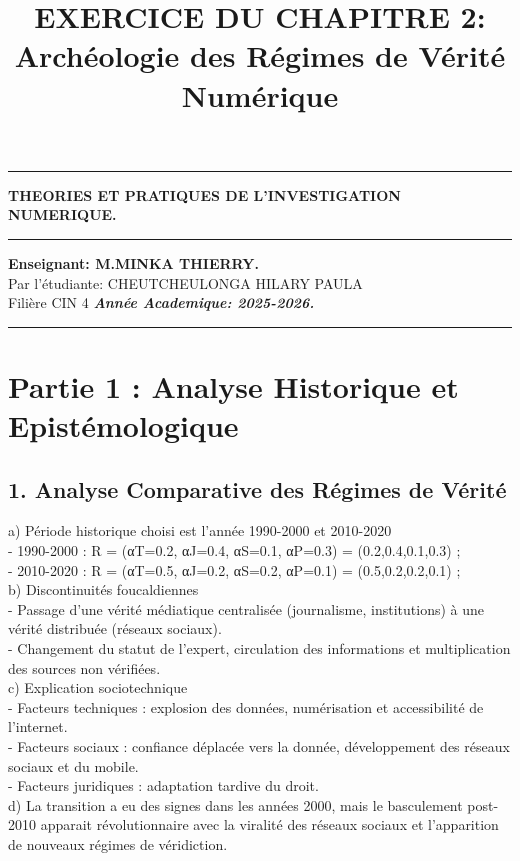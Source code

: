 \documentclass[french]{article}
\title{\textbf{EXERCICE DU CHAPITRE 2: Archéologie des Régimes de Vérité
		Numérique}}
\date{}
\begin{document}
\thispagestyle{empty}
\begin{center}
	\rule{1\textwidth}{2pt}\vspace{\baselineskip}
	\vspace{\baselineskip}\huge\textbf{THEORIES ET PRATIQUES DE L’INVESTIGATION  NUMERIQUE.}
	\rule{1\textwidth}{2pt}\vspace{\baselineskip}
	\vspace{\baselineskip}
	\vfill
	\textbf{Enseignant: M.MINKA THIERRY.}\\
	\vfill
	Par l'étudiante: CHEUTCHEULONGA HILARY PAULA\\
	Filière CIN 4\vfill
	\vspace{\baselineskip}
	\emph{\textbf{Année Academique: 2025-2026.}}
	\rule{1\textwidth}{2pt}\vspace{\baselineskip}
\end{center}
\maketitle

\section{Partie 1 : Analyse Historique et Epistémologique}
\subsection*{1.	Analyse Comparative des Régimes de Vérité}
a)	Période historique choisi est l’année 1990-2000 et 2010-2020\\
-	1990-2000 : R⃗ = (αT=0.2, αJ=0.4, αS=0.1, αP=0.3) = (0.2,0.4,0.1,0.3) ;\\
-	2010-2020 : R⃗ = (αT=0.5, αJ=0.2, αS=0.2, αP=0.1) = (0.5,0.2,0.2,0.1) ;\\
b)	Discontinuités foucaldiennes\\
-	Passage d’une vérité médiatique centralisée (journalisme, institutions) à une vérité distribuée (réseaux sociaux).\\
-	Changement du statut de l’expert, circulation des informations et multiplication des sources non vérifiées.\\
c)	Explication sociotechnique\\
-	Facteurs techniques : explosion des données, numérisation et accessibilité de l’internet.\\
-	Facteurs sociaux : confiance déplacée vers la donnée, développement des réseaux sociaux et du mobile.\\
-	Facteurs juridiques : adaptation tardive du droit.\\
d)	La transition a eu des signes dans les années 2000, mais le basculement post-2010 apparait révolutionnaire avec la viralité des réseaux sociaux et l’apparition de nouveaux régimes de véridiction.\\
\end{document}
